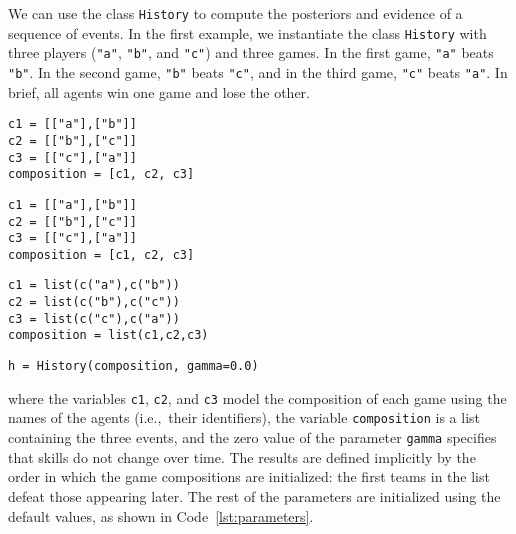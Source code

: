 \documentclass[article]{jss}
\begin{document}
We can use the class \texttt{History} to compute the posteriors and evidence of a sequence of events. 
In the first example, we instantiate the class \texttt{History} with three players (\texttt{"a"}, \texttt{"b"}, and \texttt{"c"}) and three games. 
In the first game, \texttt{"a"} beats \texttt{"b"}. In the second game, \texttt{"b"} beats \texttt{"c"}, and in the third game, \texttt{"c"} beats \texttt{"a"}. 
In brief, all agents win one game and lose the other. 
%
\begin{paracol}{3}
\begin{lstlisting}[backgroundcolor=\color{julia!60},belowskip=-0.77 \baselineskip]
c1 = [["a"],["b"]]
c2 = [["b"],["c"]]
c3 = [["c"],["a"]]
composition = [c1, c2, c3]
\end{lstlisting}
  \switchcolumn
\begin{lstlisting}[backgroundcolor=\color{python!60},belowskip=-0.77 \baselineskip]
c1 = [["a"],["b"]]
c2 = [["b"],["c"]]
c3 = [["c"],["a"]]
composition = [c1, c2, c3]
\end{lstlisting}
   \switchcolumn
\begin{lstlisting}[backgroundcolor=\color{r!50},belowskip=-0.77 \baselineskip]
c1 = list(c("a"),c("b"))
c2 = list(c("b"),c("c"))
c3 = list(c("c"),c("a"))
composition = list(c1,c2,c3)
\end{lstlisting}
\end{paracol}
\begin{lstlisting}[captionpos=b,backgroundcolor=\color{all},label=lst:history, caption={Initialization of a \texttt{History}'s instance with a three events sequence.},belowskip=0cm]
h = History(composition, gamma=0.0)
\end{lstlisting}
%
where the variables \texttt{c1}, \texttt{c2}, and \texttt{c3} model the composition of each game using the names of the agents (i.e.,~their identifiers), the variable \texttt{composition} is a list containing the three events, and the zero value of the parameter \texttt{gamma} specifies that skills do not change over time. 
The results are defined implicitly by the order in which the game compositions are initialized: the first teams in the list defeat those appearing later. 
The rest of the parameters are initialized using the default values, as shown in Code~\ref{lst:parameters}. 

\end{document}
